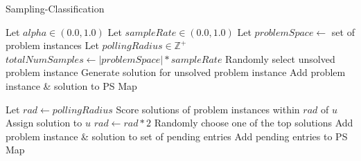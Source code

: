 


\begin{algorithm}
\caption{Sampling-Classification}   
\label{alg:sc}
\small
\begin{algorithmic}[1] 
  
  \State Let $alpha \in (0.0,1.0)$
  \State Let $sampleRate \in (0.0,1.0)$
  \State Let $problemSpace \leftarrow$ set of problem instances
  \State Let $pollingRadius \in \mathbb{Z}^+$ 
  \State $totalNumSamples \leftarrow |problemSpace| * sampleRate$
    \State Randomly select unsolved problem instance
    \State Generate solution for unsolved problem instance
    \State Add problem instance \& solution to PS Map
  \EndFor

    \State Let $rad \leftarrow pollingRadius$
      \State Score solutions of problem instances within $rad$ of $u$
        \State Assign solution to $u$
      \Else 
        \State $rad \leftarrow rad * 2$
      \EndIf
    \EndWhile
      \State Randomly choose one of the top solutions
    \EndIf
    \State Add problem instance \& solution to set of pending entries 
  \EndFor
  \State Add pending entries to PS Map 
\end{algorithmic}
\end{algorithm}


